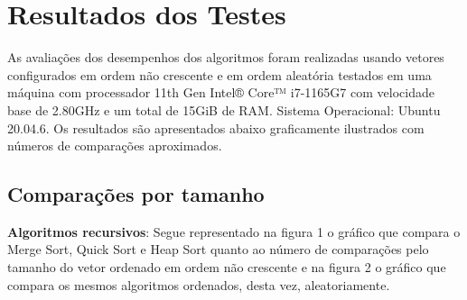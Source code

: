 \documentclass[conference]{IEEEtran}
\begin{document}
\section{Resultados dos Testes}
As avaliações dos desempenhos dos algoritmos foram realizadas usando vetores configurados em ordem não crescente e em ordem aleatória testados em uma máquina com processador 11th Gen Intel® Core™ i7-1165G7 com velocidade base de 2.80GHz e um total de 15GiB de RAM. Sistema Operacional: Ubuntu 20.04.6. Os resultados são apresentados abaixo graficamente ilustrados com números de comparações aproximados.

\subsection{Comparações por tamanho}

\textbf{Algoritmos recursivos}: Segue representado na figura 1 o gráfico que compara o Merge Sort, Quick Sort e Heap Sort quanto ao número de comparações pelo tamanho do vetor ordenado em ordem não crescente e na figura 2 o gráfico que compara os mesmos algoritmos ordenados, desta vez, aleatoriamente.
\end{document}
